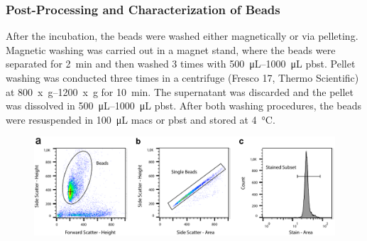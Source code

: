 \subsubsection{Post-Processing and Characterization of Beads}
\label{sec:meth:beadCharact}
After the incubation, the beads were washed either magnetically or via pelleting. Magnetic washing was carried out in a magnet stand, where the beads were separated for \SI{2}{\minute} and then washed 3 times with \SIrange{500}{1000}{\micro\liter} \gls{pbst}. Pellet washing was conducted three times in a centrifuge (Fresco 17, Thermo Scientific) at \SIrange{800}{1200}{x g} for \SI{10}{\minute}. The supernatant was discarded and the pellet was dissolved in \SIrange{500}{1000}{\micro\liter} \gls{pbst}. After both washing procedures, the beads were  resuspended in \SI{100}{\micro\liter} \gls{macs} or \gls{pbst} and stored at \SI{4}{\degreeCelsius}.
\begin{figure}[htb!]
	\centering 
	\includegraphics[width=\linewidth] {Ressources/GatingStrategy/GatingStrategy-Layout}
	\label{fig:gatingstrategy-layout}
\end{figure}

